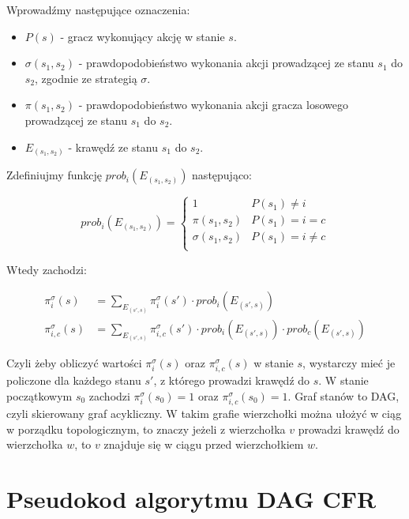 \documentclass[licencjacka]{pracamgr}
\begin{document}
\noindent
Wprowadźmy następujące oznaczenia:

\begin{itemize}
\item $P(s)$ - gracz wykonujący akcję w stanie $s$.
\item $\sigma(s_1, s_2)$ - prawdopodobieństwo wykonania akcji prowadzącej ze stanu $s_1$ do $s_2$, zgodnie ze strategią $\sigma$.
\item $\pi(s_1, s_2)$ - prawdopodobieństwo wykonania akcji gracza losowego prowadzącej ze stanu $s_1$ do $s_2$.
\item $E_{(s_1, s_2)}$ - krawędź ze stanu $s_1$ do $s_2$.
\end{itemize}

\noindent
Zdefiniujmy funkcję $prob_i(E_{(s_1, s_2)})$ następująco:

\begin{equation*}
prob_i(E_{(s_1, s_2)}) = \begin{cases}
                            1                & P(s_1) \neq i     \\
                            \pi(s_1, s_2)    & P(s_1) = i = c    \\
                            \sigma(s_1, s_2) & P(s_1) = i \neq c \\
                          \end{cases}
\end{equation*}

\noindent
Wtedy zachodzi:

\begin{align*}
\pi_i^{\sigma}(s) &= \sum\limits_{E_{(s', s)}} \pi_i^{\sigma}(s') \cdot prob_i(E_{(s', s)}) \\
\pi_{i, c}^{\sigma}(s) &= \sum\limits_{E_{(s', s)}} \pi_{i, c}^{\sigma}(s') \cdot prob_i(E_{(s', s)}) \cdot prob_c(E_{(s', s)})
\end{align*}

\noindent
Czyli żeby obliczyć wartości $\pi_i^{\sigma}(s)$ oraz $\pi_{i, c}^{\sigma}(s)$ w stanie $s$, wystarczy
mieć je policzone dla każdego stanu $s'$, z którego prowadzi krawędź do $s$. W stanie początkowym $s_0$ zachodzi
$\pi_i^{\sigma}(s_0) = 1$ oraz $\pi_{i, c}^{\sigma}(s_0) = 1$. Graf stanów to DAG, czyli
skierowany graf acykliczny. W takim grafie wierzchołki można ułożyć w ciąg w porządku topologicznym, to znaczy
jeżeli z wierzchołka $v$ prowadzi krawędź do wierzchołka $w$, to $v$ znajduje się w ciągu przed wierzchołkiem $w$.

\section{Pseudokod algorytmu DAG CFR}
\end{document}
